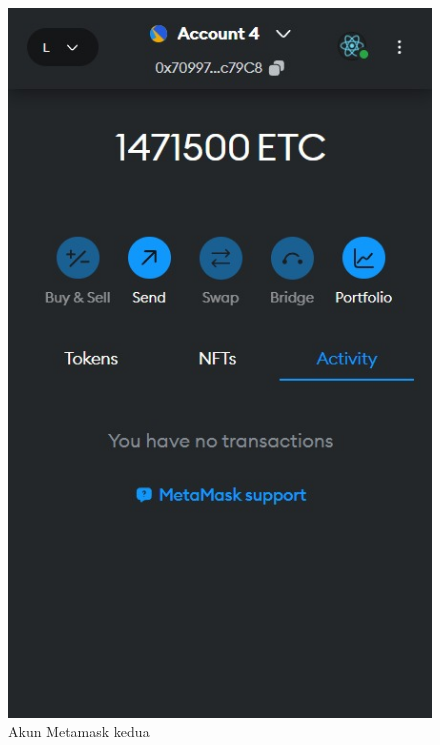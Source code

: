       \begin{figure} [H] \centering
        \includegraphics[scale=0.47]{gambar/metamask_akun_2.jpeg}
        \caption{Akun Metamask kedua}
        \label{fig:akun2}
        \end{figure} 
